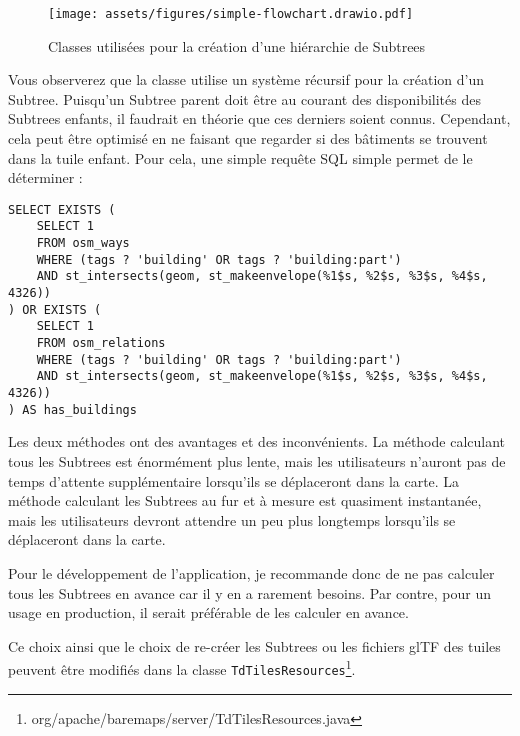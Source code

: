 \begin{figure}[H]
    \centering
    \texttt{[image: assets/figures/simple-flowchart.drawio.pdf]}
    \caption{Classes utilisées pour la création d'une hiérarchie de Subtrees}
    \label{fig:ssimple-flowchart}
\end{figure}

Vous observerez que la classe utilise un système récursif pour la création d'un Subtree. Puisqu'un Subtree parent doit être au courant des disponibilités des Subtrees enfants, il faudrait en théorie que ces derniers soient connus. Cependant, cela peut être optimisé en ne faisant que regarder si des bâtiments se trouvent dans la tuile enfant. Pour cela, une simple requête SQL simple permet de le déterminer :

\begin{verbatim}
SELECT EXISTS (
    SELECT 1
    FROM osm_ways
    WHERE (tags ? 'building' OR tags ? 'building:part')
    AND st_intersects(geom, st_makeenvelope(%1$s, %2$s, %3$s, %4$s, 4326))
) OR EXISTS (
    SELECT 1
    FROM osm_relations
    WHERE (tags ? 'building' OR tags ? 'building:part')
    AND st_intersects(geom, st_makeenvelope(%1$s, %2$s, %3$s, %4$s, 4326))
) AS has_buildings
\end{verbatim}

Les deux méthodes ont des avantages et des inconvénients. La méthode calculant tous les Subtrees est énormément plus lente, mais les utilisateurs n'auront pas de temps d'attente supplémentaire lorsqu'ils se déplaceront dans la carte. La méthode calculant les Subtrees au fur et à mesure est quasiment instantanée, mais les utilisateurs devront attendre un peu plus longtemps lorsqu'ils se déplaceront dans la carte.

Pour le développement de l'application, je recommande donc de ne pas calculer tous les Subtrees en avance car il y en a rarement besoins. Par contre, pour un usage en production, il serait préférable de les calculer en avance.

Ce choix ainsi que le choix de re-créer les Subtrees ou les fichiers glTF des tuiles peuvent être modifiés dans la classe \texttt{TdTilesResources}\footnote{org/apache/baremaps/server/TdTilesResources.java}.